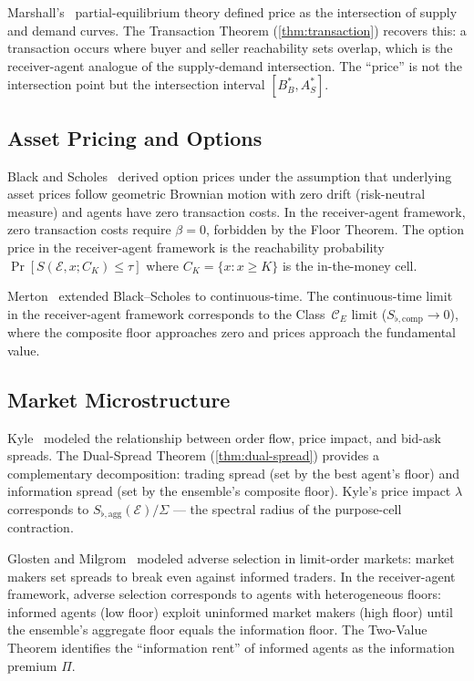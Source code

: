 \documentclass[twocolumn,11pt,a4paper]{article}
\theoremstyle{remark}
\newcommand{\tol}{\tau}
\newcommand{\Ens}{\mathcal{E}}
\newcommand{\Bid}{B^*}                   %
\newcommand{\Ask}{A^*}                   %
\newcommand{\SflatT}{S_{\flat,\mathrm{agg}}}        %
\newcommand{\SflatI}{S_{\flat,\mathrm{comp}}}       %
\newcommand{\Prem}{\Pi}                  %
\begin{document}
Marshall's~\cite{marshall1890} partial-equilibrium theory defined price as
the intersection of supply and demand curves.  The Transaction Theorem
(\cref{thm:transaction}) recovers this: a transaction occurs where buyer and
seller reachability sets overlap, which is the receiver-agent analogue of the
supply-demand intersection.  The ``price'' is not the intersection point but
the intersection interval $[\Bid_B, \Ask_S]$.

\subsection{Asset Pricing and Options}
\label{sec:lit:asset}

Black and Scholes~\cite{blackscholes1973} derived option prices under the
assumption that underlying asset prices follow geometric Brownian motion with
zero drift (risk-neutral measure) and agents have zero transaction costs.
In the receiver-agent framework, zero transaction costs require $\beta = 0$,
forbidden by the Floor Theorem.  The option price in the receiver-agent
framework is the reachability probability $\Pr[S(\Ens, x; C_K) \le \tol]$
where $C_K = \{x : x \ge K\}$ is the in-the-money cell.

Merton~\cite{merton1973} extended Black--Scholes to continuous-time.  The
continuous-time limit in the receiver-agent framework corresponds to the
Class~$\mathcal{C}_E$ limit ($\SflatI \to 0$), where the composite floor
approaches zero and prices approach the fundamental value.

\subsection{Market Microstructure}
\label{sec:lit:micro}

Kyle~\cite{kyle1985} modeled the relationship between order flow, price
impact, and bid-ask spreads.  The Dual-Spread Theorem (\cref{thm:dual-spread})
provides a complementary decomposition: trading spread (set by the best
agent's floor) and information spread (set by the ensemble's composite floor).
Kyle's price impact $\lambda$ corresponds to $\SflatT(\Ens)/\Sigma$ — the
spectral radius of the purpose-cell contraction.

Glosten and Milgrom~\cite{glostenmilgrom1985} modeled adverse selection in
limit-order markets: market makers set spreads to break even against informed
traders.  In the receiver-agent framework, adverse selection corresponds to
agents with heterogeneous floors: informed agents (low floor) exploit
uninformed market makers (high floor) until the ensemble's aggregate floor
equals the information floor.  The Two-Value Theorem identifies the
``information rent'' of informed agents as the information premium $\Prem$.
\end{document}

